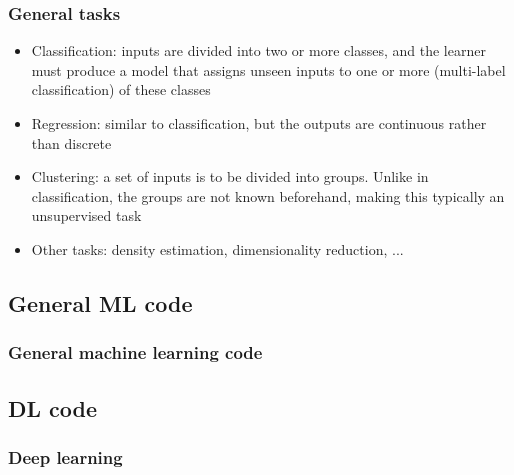 \begin{frame}
  \MyLogo
  \frametitle{General tasks}  

\begin{itemize}

\item Classification: inputs are divided into two or more classes, and the learner must produce a model that assigns unseen inputs to one or more (multi-label classification) of these classes

\item Regression: similar to classification, but the outputs are continuous rather than discrete

\item Clustering: a set of inputs is to be divided into groups. Unlike in classification, the groups are not known beforehand, making this typically an unsupervised task

\item Other tasks: density estimation, dimensionality reduction, ...

\end{itemize}

\end{frame}

\subsection{General ML code}

\begin{frame}
  \MyLogo
  \frametitle{General machine learning code}  

\end{frame}

\subsection{DL code}

\begin{frame}
  \MyLogo
  \frametitle{Deep learning}  

\end{frame}
